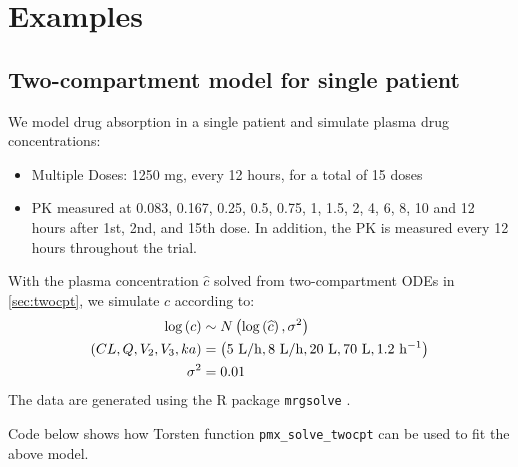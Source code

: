 \documentclass[11pt, reqno, oneside]{amsbook}
\numberwithin{equation}{chapter}
\numberwithin{figure}{chapter}
\numberwithin{table}{chapter}
\theoremstyle{remark}
\begin{document}
\chapter{Examples}
\label{sec:org19e9263}
\section{Two-compartment model for single patient}
\label{sec:org6dcbb0b}
We model drug absorption in a single patient and simulate plasma drug concentrations:

\begin{itemize}
\item Multiple Doses: 1250 mg, every 12 hours, for a total of 15 doses
\item PK measured at 0.083, 0.167, 0.25, 0.5, 0.75, 1, 1.5, 2, 4, 6,
8, 10 and 12 hours after 1st, 2nd, and 15th dose. In addition, the
PK is measured every 12 hours throughout the trial.
\end{itemize}

With the plasma concentration \(\hat{c}\) solved from
two-compartment ODEs in \ref{sec:twocpt}, we simulate \(c\) according to:
\begin{align*}
  \log\left(c\right) &\sim N\left(\log\left(\widehat{c}\right),\sigma^2\right) \\
  \left(CL, Q, V_2, V_3, ka\right) &= \left(5\ {\rm L/h}, 8\  {\rm L/h}, 20\  {\rm L},  70\ {\rm L}, 1.2\ {\rm h^{-1}} \right) \\
  \sigma^2 &= 0.01
\end{align*}
The data are generated using the R package \texttt{mrgsolve} \cite{Baron000}.

Code below shows how Torsten function \texttt{pmx\_solve\_twocpt} can be used to fit the above model.
\end{document}
